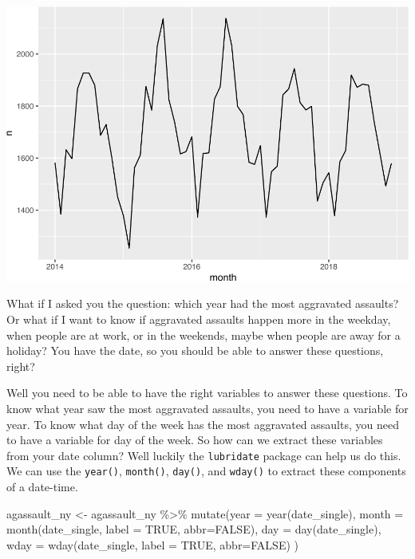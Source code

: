 \documentclass[
]{book}
\newenvironment{Shaded}{\begin{snugshade}}{\end{snugshade}}
\newcommand{\AttributeTok}[1]{\textcolor[rgb]{0.77,0.63,0.00}{#1}}
\newcommand{\ConstantTok}[1]{\textcolor[rgb]{0.00,0.00,0.00}{#1}}
\newcommand{\FunctionTok}[1]{\textcolor[rgb]{0.00,0.00,0.00}{#1}}
\newcommand{\NormalTok}[1]{#1}
\newcommand{\OtherTok}[1]{\textcolor[rgb]{0.56,0.35,0.01}{#1}}
\newcommand{\SpecialCharTok}[1]{\textcolor[rgb]{0.00,0.00,0.00}{#1}}
\begin{document}
\includegraphics{crime_mapping_files/figure-latex/ggplot_rounding_8b-1.pdf}

What if I asked you the question: which year had the most aggravated assaults? Or what if I want to know if aggravated assaults happen more in the weekday, when people are at work, or in the weekends, maybe when people are away for a holiday? You have the date, so you should be able to answer these questions, right?

Well you need to be able to have the right variables to answer these questions. To know what year saw the most aggravated assaults, you need to have a variable for year. To know what day of the week has the most aggravated assaults, you need to have a variable for day of the week. So how can we extract these variables from your date column? Well luckily the \texttt{lubridate} package can help us do this. We can use the \texttt{year()}, \texttt{month()}, \texttt{day()}, and \texttt{wday()} to extract these components of a date-time.

\begin{Shaded}
\begin{Highlighting}[]
\NormalTok{agassault\_ny }\OtherTok{\textless{}{-}}\NormalTok{ agassault\_ny }\SpecialCharTok{\%\textgreater{}\%} 
  \FunctionTok{mutate}\NormalTok{(}\AttributeTok{year =} \FunctionTok{year}\NormalTok{(date\_single), }
         \AttributeTok{month =} \FunctionTok{month}\NormalTok{(date\_single, }\AttributeTok{label =} \ConstantTok{TRUE}\NormalTok{, }\AttributeTok{abbr=}\ConstantTok{FALSE}\NormalTok{), }
         \AttributeTok{day =} \FunctionTok{day}\NormalTok{(date\_single), }
         \AttributeTok{wday =} \FunctionTok{wday}\NormalTok{(date\_single, }\AttributeTok{label =} \ConstantTok{TRUE}\NormalTok{, }\AttributeTok{abbr=}\ConstantTok{FALSE}\NormalTok{)}
\NormalTok{         )}
\end{Highlighting}
\end{Shaded}
\end{document}
